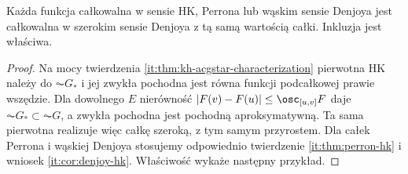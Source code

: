 \begin{wniosek}
Każda funkcja całkowalna w sensie HK, Perrona lub wąskim sensie Denjoya jest całkowalna w szerokim sensie Denjoya z tą samą wartością całki. Inkluzja jest właściwa.
\end{wniosek}
\begin{proof}
Na mocy twierdzenia \ref{it:thm:kh-acgstar-characterization} pierwotna HK należy do $\AC G_*$ i jej zwykła pochodna jest równa funkcji podcałkowej prawie wszędzie. Dla dowolnego $E$ nierówność $|F(v)-F(u)|\le\osc_{[u,v]}F$ daje $\AC G_*\subset\AC G$, a zwykła pochodna jest pochodną aproksymatywną. Ta sama pierwotna realizuje więc całkę szeroką, z tym samym przyrostem. Dla całek Perrona i wąskiej Denjoya stosujemy odpowiednio twierdzenie \ref{it:thm:perron-hk} i wniosek \ref{it:cor:denjoy-hk}. Właściwość wykaże następny przykład.
\end{proof}
